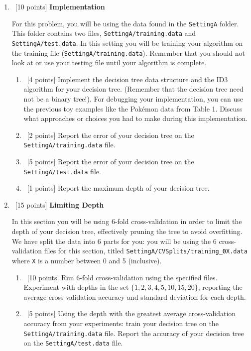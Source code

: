 \begin{enumerate}
\item ~[10 points] \textbf{Implementation}

  For this problem, you will be using the data found in the \texttt{SettingA} folder. This folder contains two files, \texttt{SettingA/training.data} and \texttt{SettingA/test.data}. In this setting you will be training your algorithm on the training file (\texttt{SettingA/training.data}). Remember that you should not look at or use your testing file until your algorithm is complete. 

  \begin{enumerate}
  \item ~[4 points] Implement the decision tree data structure and the ID3 algorithm for your decision tree. (Remember that the decision tree need not be a binary tree!). For debugging your implementation, you can use the previous toy examples like the Pok\'emon data from Table 1. Discuss what approaches or choices you had to make during this implementation. 
    
  \item ~[2 points]  Report the error of your decision tree on the \texttt{SettingA/training.data} file. 
    
  \item ~[5 points] Report the error of your decision tree on the \texttt{SettingA/test.data} file. 
    
  \item ~[1 points] Report the maximum depth of your decision tree. 
  \end{enumerate}

\item ~[15 points] \textbf{Limiting Depth}

  In this section you will be using 6-fold cross-validation in order to limit the depth of your decision tree, effectively pruning the tree to avoid overfitting. We have split the data into 6 parts for you: you will be using the 6 cross-validation files for this section, titled \texttt{SettingA/CVSplits/training\_0X.data} where \texttt{X} is a number between 0 and 5 (inclusive).

  \begin{enumerate}
  \item ~[10 points] Run 6-fold cross-validation using the specified files. Experiment with depths in the set $\{1,2,3,4,5,10,15,20\}$, reporting the average cross-validation accuracy and standard deviation for each depth.
    
  \item ~[5 points]  Using the depth with the greatest average cross-validation accuracy from your experiments: train your decision tree on the \texttt{SettingA/training.data} file. Report the accuracy of your decision tree on the \texttt{SettingA/test.data} file. 	
  \end{enumerate}

\end{enumerate}


